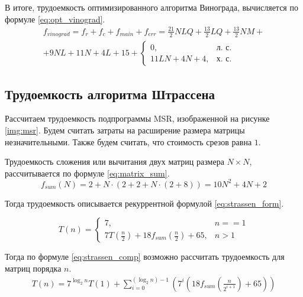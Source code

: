 В итоге, трудоемкость оптимизированного алгоритма Винограда, вычисляется по формуле \eqref{eq:opt_vinograd}.
\begin{equation}
	\label{eq:opt_vinograd}
	\begin{gathered}
		f_{vinograd} = f_{r} + f_{c} + f_{main} + f_{err} = \frac{21}{2}NLQ + \frac{13}{2}LQ + \frac{13}{2} NM + \\
		+ 9NL + 11N + 4L + 15 + 
		\begin{cases}
			0, & \text{л.~с.}\\
			11LN + 4N + 4, & \text{х.~с.}
		\end{cases}
	\end{gathered}
\end{equation}


\subsection{Трудоемкость алгоритма Штрассена}

Рассчитаем трудоемкость подпрограммы MSR, изображенной на рисунке \ref{img:msr}. 
Будем считать затраты на расширение размера матрицы незначительными. 
Также будем считать, что стоимость срезов равна $1$.

Трудоемкость сложения или вычитания двух матриц размера $N \times N$, рассчитывается по формуле \eqref{eq:matrix_sum}.
\begin{equation}
	\label{eq:matrix_sum}
	f_{sum}(N) = 2 + N \cdot (2 + 2 + N \cdot (2 + 8)) = 10N^2 + 4N + 2
\end{equation}

Тогда трудоемкость описывается рекуррентной формулой \eqref{eq:strassen_form}.

\begin{equation}
	\label{eq:strassen_form}
	T(n) = 
	\begin{cases}
		7, & n == 1\\
		7T(\frac{n}{2}) + 18f_{sum}(\frac{n}{2}) + 65, & n > 1
	\end{cases}
\end{equation}

Тогда по формуле \eqref{eq:strassen_comp} возможно рассчитать трудоемкость для матриц порядка $n$.
\begin{equation}
	\label{eq:strassen_comp}
	\begin{gathered}
		T(n) = 7^{\log_{2}{n}} T(1) + \sum_{i=0}^{(\log_{2}{n}) - 1} (7^i (18f_{sum}(\frac{n}{2 ^ {i + 1}}) + 65))
	\end{gathered}
\end{equation}


